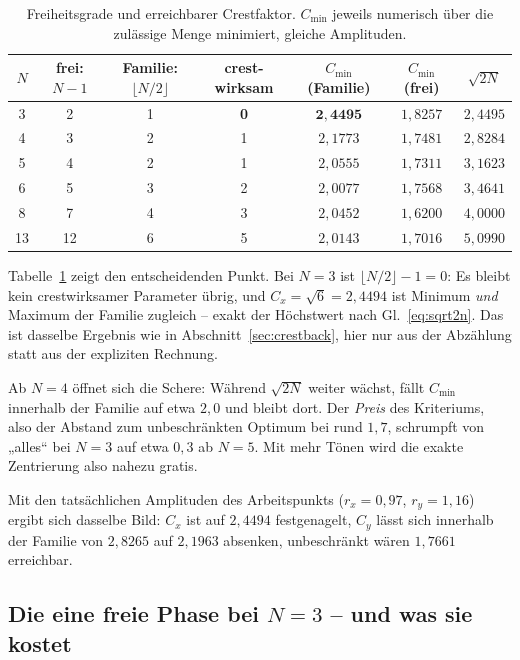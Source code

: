 \documentclass[11pt,a4paper]{article}
\newcommand{\crest}{\ensuremath{C}}
\begin{document}
\begin{table}[htb]
  \centering
  \caption{Freiheitsgrade und erreichbarer Crestfaktor. $\crest_{\min}$
  jeweils numerisch über die zulässige Menge minimiert, gleiche Amplituden.}
  \label{tab:dims}
  \begin{tabular}{ccccccc}
    \toprule
    $N$ & frei: $N-1$ & Familie: $\lfloor N/2\rfloor$ & crest-wirksam
        & $\crest_{\min}$ (Familie) & $\crest_{\min}$ (frei) & $\sqrt{2N}$\\
    \midrule
     3 &  2 & 1 & \textbf{0} & $\mathbf{2{,}4495}$ & $1{,}8257$ & $2{,}4495$\\
     4 &  3 & 2 & 1 & $2{,}1773$ & $1{,}7481$ & $2{,}8284$\\
     5 &  4 & 2 & 1 & $2{,}0555$ & $1{,}7311$ & $3{,}1623$\\
     6 &  5 & 3 & 2 & $2{,}0077$ & $1{,}7568$ & $3{,}4641$\\
     8 &  7 & 4 & 3 & $2{,}0452$ & $1{,}6200$ & $4{,}0000$\\
    13 & 12 & 6 & 5 & $2{,}0143$ & $1{,}7016$ & $5{,}0990$\\
    \bottomrule
  \end{tabular}
\end{table}

Tabelle~\ref{tab:dims} zeigt den entscheidenden Punkt. Bei $N=3$ ist
$\lfloor N/2\rfloor-1=0$: Es bleibt kein crestwirksamer Parameter übrig, und
$\crest_x = \sqrt{6} = 2{,}4494$ ist Minimum \emph{und} Maximum der Familie
zugleich -- exakt der Höchstwert nach Gl.~\eqref{eq:sqrt2n}. Das ist
dasselbe Ergebnis wie in Abschnitt~\ref{sec:crestback}, hier nur aus der
Abzählung statt aus der expliziten Rechnung.

Ab $N=4$ öffnet sich die Schere: Während $\sqrt{2N}$ weiter wächst, fällt
$\crest_{\min}$ innerhalb der Familie auf etwa $2{,}0$ und bleibt dort. Der
\emph{Preis} des Kriteriums, also der Abstand zum unbeschränkten Optimum bei
rund $1{,}7$, schrumpft von „alles`` bei $N=3$ auf etwa $0{,}3$ ab $N=5$. Mit
mehr Tönen wird die exakte Zentrierung also nahezu gratis.

Mit den tatsächlichen Amplituden des Arbeitspunkts ($r_x=0{,}97$,
$r_y=1{,}16$) ergibt sich dasselbe Bild: $\crest_x$ ist auf $2{,}4494$
festgenagelt, $\crest_y$ lässt sich innerhalb der Familie von $2{,}8265$ auf
$2{,}1963$ absenken, unbeschränkt wären $1{,}7661$ erreichbar.

\subsection{Die eine freie Phase bei \boldmath$N=3$ -- und was sie kostet}
\label{sec:psi}
\end{document}
